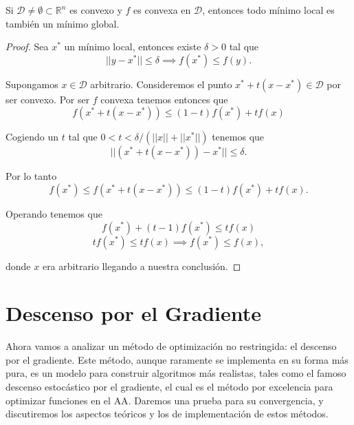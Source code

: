 \begin{theorem}
    Si $\mathcal{D} \ne \emptyset \subset \mathbb{R}^n$ es convexo y $f$ es convexa en $\mathcal{D}$, entonces todo mínimo local es también un mínimo global.
\end{theorem}

\begin{proof}
    Sea $x^*$ un mínimo local, entonces existe $\delta > 0$ tal que
    \begin{equation}
        || y - x^* || \le \delta \implies f(x^*) \le f(y).
    \end{equation}

    Supongamos $x \in \mathcal{D}$ arbitrario. Consideremos el punto $x^* + t(x - x^*) \in \mathcal{D}$ por ser convexo. Por ser $f$ convexa tenemos entonces que
    \begin{equation}
        f(x^* + t(x - x^*)) \le (1-t)f(x^*) + tf(x)
    \end{equation}

    Cogiendo un $t$ tal que $0 < t < \delta/(||x|| + ||x^*||)$ tenemos que
    \begin{equation}
        ||(x^* + t(x - x^*)) - x^*|| \le \delta.
    \end{equation}

    Por lo tanto
    \begin{equation}
        f(x^*) \le f(x^* + t(x - x^*)) \le (1-t)f(x^*) + tf(x).
    \end{equation}

    Operando tenemos que
    \begin{equation}
        f(x^*) + (t-1)f(x^*) \le tf(x)
    \end{equation}
    \begin{equation}
        tf(x^*) \le tf(x) \implies f(x^*) \le f(x),
    \end{equation}

    donde $x$ era arbitrario llegando a nuestra conclusión.
\end{proof}

\section{Descenso por el Gradiente}
Ahora vamos a analizar un método de optimización no restringida: el descenso por el gradiente. Este método, aunque raramente se implementa en su forma más pura, es un modelo para construir algoritmos más realistas, tales como el famoso descenso estocástico por el gradiente, el cual es el método por excelencia para optimizar funciones en el \ac{AA}. Daremos una prueba para su convergencia, y discutiremos los aspectos teóricos y los de implementación de estos métodos.

